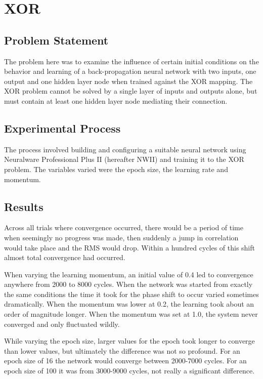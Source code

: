 \documentclass[12pt]{article}
\begin{document}
\maketitle

\section{XOR}

\subsection{Problem Statement}

The problem here was to examine the influence of certain initial conditions on the behavior and learning of a back-propagation neural network with two inputs, one output and one hidden layer node when trained against the XOR mapping.  The XOR problem cannot be solved by a single layer of inputs and outputs alone, but must contain at least one hidden layer node mediating their connection.  

\subsection{Experimental Process}

The process involved building and configuring a suitable neural network using Neuralware Professional Plus II (hereafter NWII) and training it to the XOR problem.  The variables varied were the epoch size, the learning rate and momentum.

\subsection{Results}

Across all trials where convergence occurred, there would be a period of time when seemingly no progress was made, then suddenly a jump in correlation would take place and the RMS would drop.  Within a hundred cycles of this shift almost total convergence had occurred.  

When varying the learning momentum, an initial value of 0.4 led to convergence anywhere from 2000 to 8000 cycles.  When the network was started from exactly the same conditions the time it took for the phase shift to occur varied sometimes dramatically.  When the momentum was lower at 0.2, the learning took about an order of magnitude longer.  When the momentum was set at 1.0, the system never converged and only fluctuated wildly.  

While varying the epoch size, larger values for the epoch took longer to converge than lower values, but ultimately the difference was not so profound.  For an epoch size of 16 the network would converge between 2000-7000 cycles.  For an epoch size of 100 it was from 3000-9000 cycles, not really a significant difference.  
\end{document}
